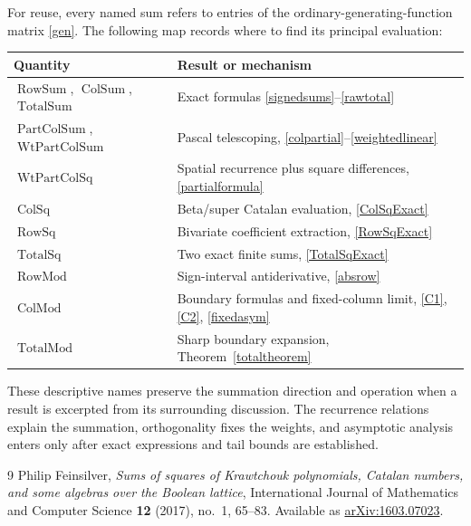 \documentclass[11pt,reqno]{amsart}
\theoremstyle{remark}\newtheorem{remark}[theorem]{Remark}
\DeclareMathOperator{\RowSum}{RowSum}
\DeclareMathOperator{\ColSum}{ColSum}
\DeclareMathOperator{\TotalSum}{TotalSum}
\DeclareMathOperator{\RowSq}{RowSq}
\DeclareMathOperator{\ColSq}{ColSq}
\DeclareMathOperator{\TotalSq}{TotalSq}
\DeclareMathOperator{\RowMod}{RowMod}
\DeclareMathOperator{\ColMod}{ColMod}
\DeclareMathOperator{\TotalMod}{TotalMod}
\DeclareMathOperator{\PartColSum}{PartColSum}
\DeclareMathOperator{\WtPartColSum}{WtPartColSum}
\DeclareMathOperator{\WtPartColSq}{WtPartColSq}
\begin{document}
For reuse, every named sum refers to entries of the ordinary-generating-function matrix \eqref{gen}. The following map records where to find its principal evaluation:
\begin{center}\small
\begin{tabular}{ll}
\textbf{Quantity}&\textbf{Result or mechanism}\\\hline
$\RowSum$, $\ColSum$, $\TotalSum$&Exact formulas \eqref{signedsums}--\eqref{rawtotal}\\
$\PartColSum$, $\WtPartColSum$&Pascal telescoping, \eqref{colpartial}--\eqref{weightedlinear}\\
$\WtPartColSq$&Spatial recurrence plus square differences, \eqref{partialformula}\\
$\ColSq$&Beta/super Catalan evaluation, \eqref{ColSqExact}\\
$\RowSq$&Bivariate coefficient extraction, \eqref{RowSqExact}\\
$\TotalSq$&Two exact finite sums, \eqref{TotalSqExact}\\
$\RowMod$&Sign-interval antiderivative, \eqref{absrow}\\
$\ColMod$&Boundary formulas and fixed-column limit, \eqref{C1}, \eqref{C2}, \eqref{fixedasym}\\
$\TotalMod$&Sharp boundary expansion, Theorem~\ref{totaltheorem}
\end{tabular}
\end{center}
These descriptive names preserve the summation direction and operation when a result is excerpted from its surrounding discussion. The recurrence relations explain the summation, orthogonality fixes the weights, and asymptotic analysis enters only after exact expressions and tail bounds are established.

\begin{thebibliography}{9}
Philip Feinsilver,
\emph{Sums of squares of Krawtchouk polynomials, Catalan numbers,
and some algebras over the Boolean lattice},
International Journal of Mathematics and Computer Science
\textbf{12} (2017), no.~1, 65--83.
Available as \href{https://arxiv.org/abs/1603.07023}{arXiv:1603.07023}.

\end{thebibliography}
\end{document}
